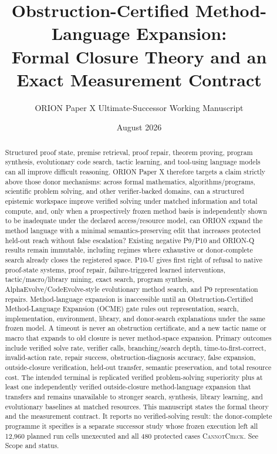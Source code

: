 \documentclass[11pt]{article}
\title{Obstruction-Certified Method-Language Expansion:\\Formal Closure Theory and an Exact Measurement Contract}
\author{ORION Paper X Ultimate-Successor Working Manuscript}
\date{August 2026}
\begin{document}
\maketitle

\begin{abstract}
Structured proof state, premise retrieval, proof repair, theorem proving, program synthesis, evolutionary code search, tactic learning, and tool-using language models can all improve difficult reasoning. ORION Paper X therefore targets a claim strictly above those donor mechanisms: across formal mathematics, algorithms/programs, scientific problem solving, and other verifier-backed domains, can a structured epistemic workspace improve verified solving under matched information and total compute, and, only when a prospectively frozen method basis is independently shown to be inadequate under the declared access/resource model, can ORION expand the method language with a minimal semantics-preserving edit that increases protected held-out reach without false escalation? Existing negative P9/P10 and ORION-Q results remain immutable, including regimes where exhaustive or donor-complete search already closes the registered space. P10-U gives first right of refusal to native proof-state systems, proof repair, failure-triggered learned interventions, tactic/macro/library mining, exact search, program synthesis, AlphaEvolve/CodeEvolve-style evolutionary method search, and P9 representation repairs. Method-language expansion is inaccessible until an Obstruction-Certified Method-Language Expansion (OCME) gate rules out representation, search, implementation, environment, library, and donor-search explanations under the same frozen model. A timeout is never an obstruction certificate, and a new tactic name or macro that expands to old closure is never method-space expansion. Primary outcomes include verified solve rate, verifier calls, branching/search depth, time-to-first-correct, invalid-action rate, repair success, obstruction-diagnosis accuracy, false expansion, outside-closure verification, held-out transfer, semantic preservation, and total resource cost. The intended terminal is replicated verified problem-solving superiority plus at least one independently verified outside-closure method-language expansion that transfers and remains unavailable to stronger search, synthesis, library learning, and evolutionary baselines at matched resources.
This manuscript states the formal theory and the measurement contract. It reports no verified-solving result: the donor-complete programme it specifies is a separate successor study whose frozen execution left all 12,960 planned run cells unexecuted and all 480 protected cases \textsc{CannotCheck}. See Scope and status.
\end{abstract}
\end{document}
